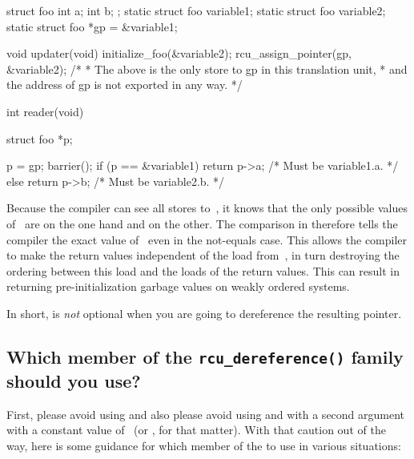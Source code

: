 \begin{VerbatimU}[samepage=false]
	struct foo {
		int a;
		int b;
	};
	static struct foo variable1;
	static struct foo variable2;
	static struct foo *gp = &variable1;

	void updater(void)
	{
		initialize_foo(&variable2);
		rcu_assign_pointer(gp, &variable2);
		/*
		 * The above is the only store to gp in this translation unit,
		 * and the address of gp is not exported in any way.
		 */
	}

	int reader(void)
	{
		struct foo *p;

		p = gp;
		barrier();
		if (p == &variable1)
			return p->a; /* Must be variable1.a. */
		else
			return p->b; /* Must be variable2.b. */
	}
\end{VerbatimU}

Because the compiler can see all stores to~, it knows that the only
possible values of~ are  on the one hand and 
on the other.
The comparison in  therefore tells the compiler
the exact value of~ even in the not-equals case.
This allows the
compiler to make the return values independent of the load from~,
in turn destroying the ordering between this load and the loads of the
return values.
This can result in  returning pre-initialization
garbage values on weakly ordered systems.

In short,  is \emph{not} optional when you are going to
dereference the resulting pointer.


\subsection{Which member of the \texttt{rcu\_dereference()} family should you use?}
\label{sec:rcu:Which member of the rcu_dereference() family should you use?}

First, please avoid using  and also please avoid
using  and  with a
second argument with a constant value of~ (or , for that matter).
With that caution out of the way, here is some guidance for which
member of the  to use in various situations:

